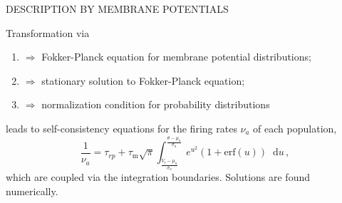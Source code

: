 \documentclass[portrait, final, a0paper, fontscale=0.34, leqno]{baposter}
\newcommand*\diff{\mathop{}\!\text{d}}
\begin{document}
\begin{poster}
{    \centerline{\uppercase{Description by membrane potentials}}
    Transformation via
    \begin{enumerate}
        \item 
        $\Rightarrow$ Fokker-Planck equation for membrane potential distributions; 
        \item 
        $\Rightarrow$ stationary solution to Fokker-Planck equation;
        \item 
        $\Rightarrow$ normalization condition for probability distributions
    \end{enumerate}
    leads to self-consistency equations for the firing rates $\nu_a$ of each population,
    \begin{equation}
        \frac{1}{\nu_{a}} = \tau_{rp} 
            + \tau_\text{m} \sqrt{\pi}
            \int_{\frac{V_\text{r} - \mu_{a}}{\sigma_{a}}}^{\frac{\theta - \mu_{a}}{\sigma_{a}}} 
            e^{u^2} \left(1 + \text{erf}(u)\right) \diff u \,,
        \label{eq:self-consistency}
    \end{equation}
    which are coupled via the integration boundaries. Solutions are found
    numerically. 
}


\end{poster}
\end{document}
